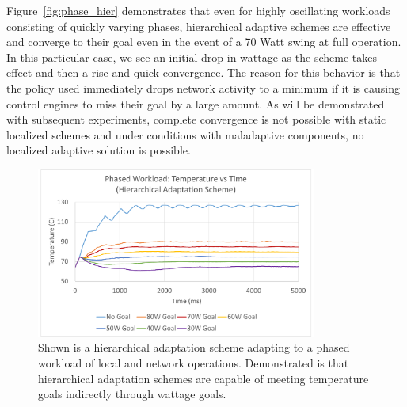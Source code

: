             Figure~\ref{fig:phase_hier} demonstrates that even for highly oscillating workloads consisting of quickly varying phases, hierarchical adaptive schemes are effective and converge to their goal even in the event of a 70 Watt swing at full operation. In this particular case, we see an initial drop in wattage as the scheme takes effect and then a rise and quick convergence. The reason for this behavior is that the policy used immediately drops network activity to a minimum if it is causing control engines to miss their goal by a large amount. As will be demonstrated with subsequent experiments, complete convergence is not possible with static localized schemes and under conditions with maladaptive components, no localized adaptive solution is possible.
            
            \begin{figure}[htb!]
                \centering
                \includegraphics[width=0.82\textwidth]{Fig/phase_hier_temp.pdf}
                \caption[Phased Workload Using an Adaptive Goal Adjustment Policy (Temperature vs Time)]{Shown is a hierarchical adaptation scheme adapting to a phased workload of local and network operations. Demonstrated is that hierarchical adaptation schemes are capable of meeting temperature goals indirectly through wattage goals.}
                \label{fig:phase_hier_temp}
            \end{figure}
            
